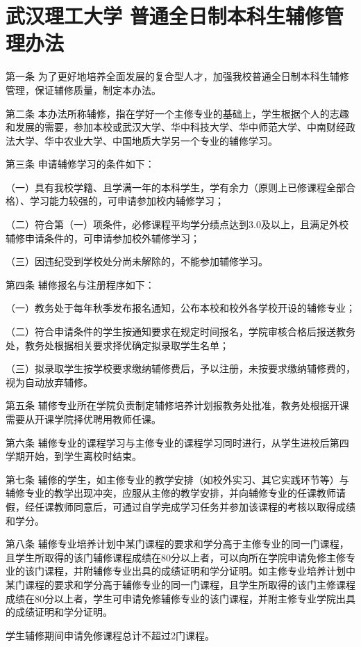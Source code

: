 \documentclass[UTF8,12pt,a4paper]{report}
\begin{document}
\chapter{武汉理工大学 普通全日制本科生辅修管理办法}
第一条  为了更好地培养全面发展的复合型人才，加强我校普通全日制本科生辅修管理，保证辅修质量，制定本办法。

第二条  本办法所称辅修，指在学好一个主修专业的基础上，学生根据个人的志趣和发展的需要，参加本校或武汉大学、华中科技大学、华中师范大学、中南财经政法大学、华中农业大学、中国地质大学另一个专业的辅修学习。

第三条  申请辅修学习的条件如下：

（一）具有我校学籍、且学满一年的本科学生，学有余力（原则上已修课程全部合格）、学习能力较强的，可申请参加校内辅修学习；

（二）符合第（一）项条件，必修课程平均学分绩点达到3.0及以上，且满足外校辅修申请条件的，可申请参加校外辅修学习；

（三）因违纪受到学校处分尚未解除的，不能参加辅修学习。

第四条  辅修报名与注册程序如下：

（一）教务处于每年秋季发布报名通知，公布本校和校外各学校开设的辅修专业；

（二）符合申请条件的学生按通知要求在规定时间报名，学院审核合格后报送教务处，教务处根据相关要求择优确定拟录取学生名单；

（三）拟录取学生按学校要求缴纳辅修费后，予以注册，未按要求缴纳辅修费的，视为自动放弃辅修。

第五条  辅修专业所在学院负责制定辅修培养计划报教务处批准，教务处根据开课需要从开课学院择优聘用教师任课。

第六条  辅修专业的课程学习与主修专业的课程学习同时进行，从学生进校后第四学期开始，到学生离校时结束。

第七条  辅修的学生，如主修专业的教学安排（如校外实习、其它实践环节等）与辅修专业的教学出现冲突，应服从主修的教学安排，并向辅修专业的任课教师请假，经任课教师同意后，可通过自学完成学习任务并参加该课程的考核以取得成绩和学分。

第八条  辅修专业培养计划中某门课程的要求和学分高于主修专业的同一门课程，且学生所取得的该门辅修课程成绩在80分以上者，可以向所在学院申请免修主修专业的该门课程，并附辅修专业出具的成绩证明和学分证明。如主修专业培养计划中某门课程的要求和学分高于辅修专业的同一门课程，且学生所取得的该门主修课程成绩在80分以上者，学生可申请免修辅修专业的该门课程，并附主修专业学院出具的成绩证明和学分证明。

学生辅修期间申请免修课程总计不超过2门课程。
\end{document}
